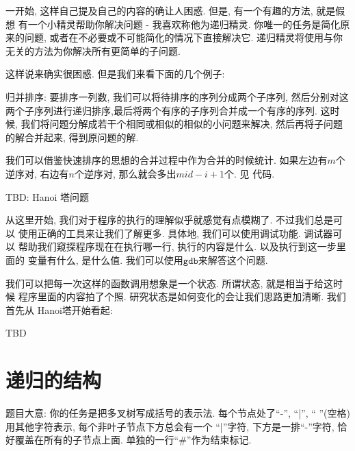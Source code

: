 一开始, 这样自己提及自己的内容的确让人困惑. 但是, 有一个有趣的方法, 就是假想
有一个小精灵帮助你解决问题 - 我喜欢称他为递归精灵. 
你唯一的任务是简化原来的问题, 或者在不必要或不可能简化的情况下直接解决它. 
递归精灵将使用与你无关的方法为你解决所有更简单的子问题. 

这样说来确实很困惑. 但是我们来看下面的几个例子: 

\begin{example}
    归并排序: 要排序一列数, 我们可以将待排序的序列分成两个子序列,
    然后分别对这两个子序列进行递归排序,最后将两个有序的子序列合并成一个有序的序列.
    这时候, 我们将问题分解成若干个相同或相似的相似的小问题来解决, 
    然后再将子问题的解合并起来, 得到原问题的解. 
\end{example}

 我们可以借鉴快速排序的思想的合并过程中作为合并的时候统计. 
如果左边有$m$个逆序对, 右边有$n$个逆序对, 那么就会多出$mid-i+1$个. 见
代码. 

\begin{example}
    TBD: Hanoi 塔问题
\end{example}


从这里开始, 我们对于程序的执行的理解似乎就感觉有点模糊了. 不过我们总是可以
使用正确的工具来让我们了解更多. 具体地, 我们可以使用调试功能. 调试器可以
帮助我们窥探程序现在在执行哪一行, 执行的内容是什么. 以及执行到这一步里面的
变量有什么, 是什么值. 我们可以使用$\texttt{gdb}$来解答这个问题. 

我们可以把每一次这样的函数调用想象是一个状态. 所谓状态, 就是相当于给这时候
程序里面的内容拍了个照. 研究状态是如何变化的会让我们思路更加清晰. 我们首先从
Hanoi塔开始看起: 

TBD

\section{递归的结构}





 题目大意: 你的任务是把多叉树写成括号的表示法. 
每个节点处了``-'', ``|'', `` ''(空格)用其他字符表示, 每个非叶子节点下方总会有一个
``|''字符, 下方是一排``-''字符, 恰好覆盖在所有的子节点上面. 单独的一行``\#''作为结束标记.



